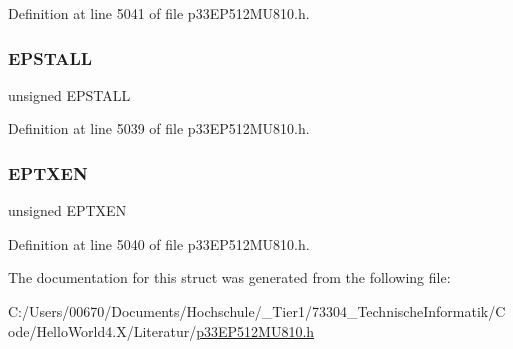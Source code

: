 Definition at line 5041 of file p33\+E\+P512\+M\+U810.\+h.

\mbox{\label{structtag_u1_e_p2_b_i_t_s_a47042104f04ebe06a23f9789bd400d7e}} 
\subsubsection{\texorpdfstring{E\+P\+S\+T\+A\+LL}{EPSTALL}}
{\footnotesize\ttfamily unsigned E\+P\+S\+T\+A\+LL}



Definition at line 5039 of file p33\+E\+P512\+M\+U810.\+h.

\mbox{\label{structtag_u1_e_p2_b_i_t_s_aa2d88c1be513e759c136823c86a355b4}} 
\subsubsection{\texorpdfstring{E\+P\+T\+X\+EN}{EPTXEN}}
{\footnotesize\ttfamily unsigned E\+P\+T\+X\+EN}



Definition at line 5040 of file p33\+E\+P512\+M\+U810.\+h.



The documentation for this struct was generated from the following file\+:\begin{DoxyCompactItemize}
\item 
C\+:/\+Users/00670/\+Documents/\+Hochschule/\+\_\+\+Tier1/73304\+\_\+\+Technische\+Informatik/\+Code/\+Hello\+World4.\+X/\+Literatur/\hyperlink{p33_e_p512_m_u810_8h}{p33\+E\+P512\+M\+U810.\+h}\end{DoxyCompactItemize}
